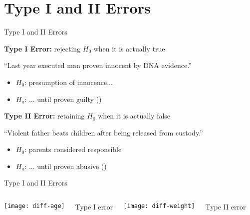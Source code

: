 \documentclass[t]{beamer}
\begin{document}
	\section{Type I and II Errors}

	\begin{frame}[t]{Type I and II Errors}

		\begin{block}{\textbf{Type I Error:} rejecting $H_0$ %
					when it is actually true}

			``Last year executed man proven innocent by DNA evidence.''
					
			\begin{itemize}
				\item $H_0$: presumption of innocence...
				\item $H_a$: ... until proven guilty ()
			\end{itemize}
		\end{block}
		
		\begin{block}{\textbf{Type II Error:} retaining $H_0$ %
					when it is actually false}

			``Violent father beats children after being released from custody.''
					
			\begin{itemize}
				\item $H_0$: parents considered responsible
				\item $H_a$: ... until proven abusive ()
			\end{itemize}

		\end{block}

	\end{frame}

	\begin{frame}[c]{Type I and II Errors}
		
		\begin{columns}[c]
			\texttt{[image: diff-age]}
			
			\begin{center}
				Type I error
			\end{center}

			\texttt{[image: diff-weight]}

			\begin{center}
				Type II error
			\end{center}
		\end{columns}
		
	\end{frame}
	
\end{document}

